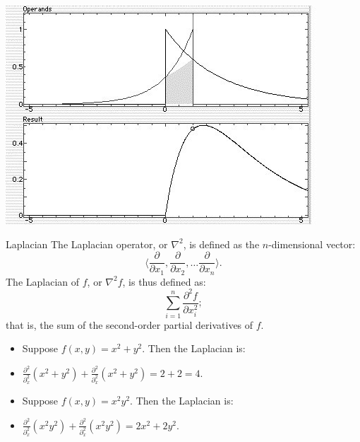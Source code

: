 \documentclass[xcolor=dvipsnames]{beamer}
\begin{document}
\begin{frame}
\includegraphics[width=\textwidth]{imgs/convolution.jpg}
\end{frame}

\begin{frame}[label=math-laplacian]{Laplacian}
 The Laplacian operator, or $\nabla^2$, is defined as the $n$-dimensional vector:
 \begin{equation}
  \langle 
   \frac{\partial}{\partial x_1},
   \frac{\partial}{\partial x_2}, \ldots
   \frac{\partial}{\partial x_n}
  \rangle.
 \end{equation}
 The Laplacian of $f$, or $\nabla^2 f$, is thus defined as:
 \begin{equation}
  \sum_{i=1}^n \frac{\partial^2 f}{\partial x_i^2};
 \end{equation}
 that is, the sum of the second-order partial derivatives of $f$.
\end{frame}

\begin{frame}
 \begin{itemize} 
 \item Suppose $f(x,y) = x^2 + y^2$. Then the Laplacian is:
 \item $\frac{\partial^2}{\partial^2_x} 
       (x^2 + y^2) +
        \frac{\partial^2}{\partial^2_x} 
       (x^2 + y^2) = 2+ 2 = 4$.
 \vspace{16pt}  
 \item Suppose $f(x,y) = x^2y^2$. Then the Laplacian is:
 \item $\frac{\partial^2}{\partial^2_x} 
       (x^2y^2) +
        \frac{\partial^2}{\partial^2_x} 
       (x^2y^2) = 2x^2 + 2y^2$.
 \end{itemize} 
\end{frame}
\end{document}
